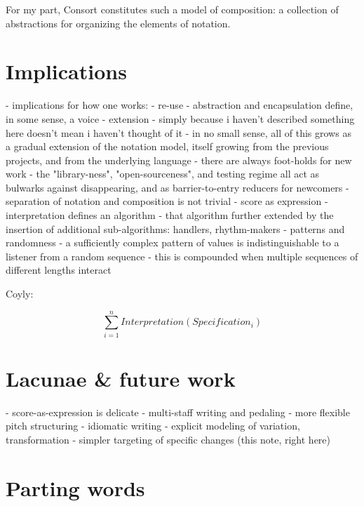 For my part, Consort constitutes such a model of composition: a collection of
abstractions for organizing the elements of notation.

\section{Implications}
\label{sec:implications}

\begin{markdown}
-   implications for how one works:
    -   re-use
        -   abstraction and encapsulation define, in some sense, a voice
    -   extension
        -   simply because i haven't described something here doesn't mean i
            haven't thought of it
        -   in no small sense, all of this grows as a gradual extension of the
            notation model, itself growing from the previous projects, and from
            the underlying language
        -   there are always foot-holds for new work
        -   the "library-ness", "open-sourceness", and testing regime all act
            as bulwarks against disappearing, and as barrier-to-entry reducers
            for newcomers
    -   separation of notation and composition is not trivial
-   score as expression
    -   interpretation defines an algorithm
    -   that algorithm further extended by the insertion of additional
        sub-algorithms: handlers, rhythm-makers
-   patterns and randomness
    -   a sufficiently complex pattern of values is indistinguishable to a
        listener from a random sequence
    -   this is compounded when multiple sequences of different lengths
        interact
\end{markdown}

Coyly:

\begin{equation}
\displaystyle\sum_{i=1}^{n} Interpretation(Specification_i)
\end{equation}

\section{Lacunae \& future work}
\label{sec:lacunae-and-future-work}

\begin{markdown}
-   score-as-expression is delicate
-   multi-staff writing and pedaling
-   more flexible pitch structuring
-   idiomatic writing
-   explicit modeling of variation, transformation
-   simpler targeting of specific changes (this note, right here)
\end{markdown}

\section{Parting words}
\label{sec:parting-words}